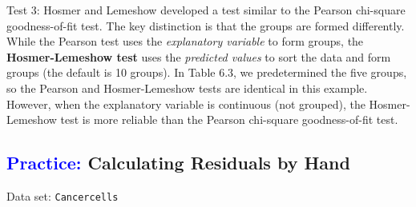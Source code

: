 \documentclass[
]{report}
\begin{document}
Test 3: Hosmer and Lemeshow developed a test similar to the Pearson chi-square goodness-of-fit test. The key distinction is that the groups are formed differently. While the Pearson test uses the \emph{explanatory variable} to form groups, the \textbf{Hosmer-Lemeshow test} uses the \emph{predicted values} to sort the data and form groups (the default is 10 groups). In Table 6.3, we predetermined the five groups, so the Pearson and Hosmer-Lemeshow tests are identical in this example. However, when the explanatory variable is continuous (not grouped), the Hosmer-Lemeshow test is more reliable than the Pearson chi-square goodness-of-fit test.

\hypertarget{calculating-residuals-by-hand}{%
\subsection*{\texorpdfstring{\textcolor{blue}{Practice:} Calculating Residuals by Hand}{ Calculating Residuals by Hand}}\label{calculating-residuals-by-hand}}

\vspace{-1em}

Data set: \texttt{Cancercells}
\end{document}
